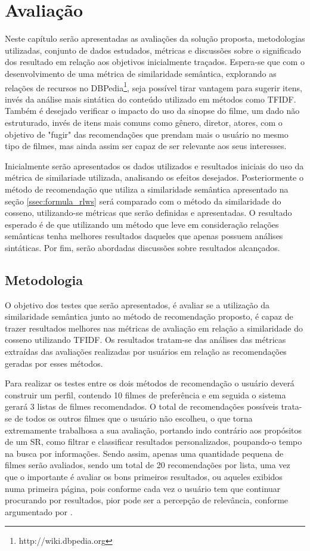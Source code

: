 \chapter{Avaliação}
\label{cap:evaluation}

Neste capítulo serão apresentadas as avaliações da solução proposta, metodologias utilizadas, conjunto de dados estudados, métricas e discussões sobre o significado dos resultado em relação aos objetivos inicialmente traçados. Espera-se que com o desenvolvimento de uma métrica de similaridade semântica, explorando as relações de recursos no DBPedia\footnote{http://wiki.dbpedia.org}, seja possível tirar vantagem para sugerir itens, invés da análise mais sintática do conteúdo utilizado em métodos como \ac{TFIDF}. Também é desejado verificar o impacto do uso da sinopse do filme, um dado não estruturado, invés de itens mais comuns como gênero, diretor, atores, com o objetivo de "fugir" das recomendações que prendam mais o usuário no mesmo tipo de filmes, mas ainda assim ser capaz de ser relevante aos seus interesses.

Inicialmente serão apresentados os dados utilizados e resultados iniciais do uso da métrica de similariade utilizada, analisando os efeitos desejados. Posteriormente o método de recomendação que utiliza a similaridade semântica apresentado na seção \ref{ssec:formula_rlws} será comparado com o método da similaridade do cosseno, utilizando-se métricas que serão definidas e apresentadas. O resultado esperado é de que utilizando um método que leve em consideração relações semânticas tenha melhores resultados daqueles que apenas possuem análises sintáticas. Por fim, serão abordadas discussões sobre resultados alcançados.

\section{Metodologia}

O objetivo dos testes que serão apresentados, é avaliar se a utilização da similaridade semântica junto ao método de recomendação proposto, é capaz de trazer resultados melhores nas métricas de avaliação em relação a similaridade do cosseno utilizando \ac{TFIDF}.  Os resultados tratam-se das análises das métricas extraídas das avaliações realizadas por usuários em relação as recomendações geradas por esses métodos.

Para realizar os testes entre os dois métodos de recomendação o usuário deverá construir um perfil, contendo 10 filmes de preferência e em seguida o sistema gerará 3 listas de filmes recomendados. O total de recomendações possíveis trata-se de todos os outros filmes que o usuário não escolheu, o que torna extremamente trabalhosa a sua avaliação, portando indo contrário aos propósitos de um \ac{SR}, como filtrar e classificar resultados personalizados, poupando-o tempo na busca por informações. Sendo assim, apenas uma quantidade pequena de filmes serão avaliados, sendo um total de 20 recomendações por lista, uma vez que o importante é avaliar os bons primeiros resultados, ou aqueles exibidos numa primeira página, pois conforme cada vez o usuário tem que continuar procurando por resultados, pior pode ser a percepção de relevância, conforme argumentado por \cite{Manning:2008}. 

